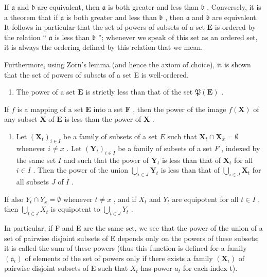 If \(\mathfrak{a}\) and \(\mathfrak{b}\) are equivalent, then \(\mathfrak{a}\) is both greater and less than \(\mathfrak{b}\) . Conversely, it is a theorem that if \(\mathfrak{a}\) is both greater and less than \(\mathfrak{b}\) , then \(\mathfrak{a}\) and \(\mathfrak{b}\) are equivalent. It follows in particular that the set of powers of subsets of a set \(\mathbf{E}\) is ordered by the relation `` \(\mathfrak{a}\) is less than \(\mathfrak{b}\) ''; whenever we speak of this set as an ordered set, it is always the ordering defined by this relation that we mean.

Furthermore, using Zorn's lemma (and hence the axiom of choice), it is shown that the set of powers of subsets of a set E is well-ordered.

\begin{enumerate}
\def\labelenumi{\arabic{enumi}.}
\setcounter{enumi}{3}
\tightlist
\item
  The power of a set \(\mathbf{E}\) is strictly less than that of the set \(\mathfrak{P}(\mathbf{E})\) .
\end{enumerate}

If \(f\) is a mapping of a set \(\mathbf{E}\) into a set \(\mathbf{F}\) , then the power of the image \(f(\mathbf{X})\) of any subset \(\mathbf{X}\) of \(\mathbf{E}\) is less than the power of \(\mathbf{X}\) .

\begin{enumerate}
\def\labelenumi{\arabic{enumi}.}
\setcounter{enumi}{4}
\tightlist
\item
  Let \((\mathbf{X}_t)_{i \in I}\) be a family of subsets of a set \(E\) such that \(\mathbf{X}_t \cap \mathbf{X}_x = \emptyset\) whenever \(i \neq x\) . Let \((\mathbf{Y}_t)_{i \in I}\) be a family of subsets of a set \(F\) , indexed by the same set \(I\) and such that the power of \(\mathbf{Y}_t\) is less than that of \(\mathbf{X}_t\) for all \(i \in I\) . Then the power of the union \(\bigcup_{i \in J} \mathbf{Y}_t\) is less than that of \(\bigcup_{i \in J} \mathbf{X}_t\) for all subsets \(J\) of \(I\) .
\end{enumerate}

If also \(Y_{t} \cap Y_{x} = \emptyset\) whenever \(t \neq x\) , and if \(X_{t}\) and \(Y_{t}\) are equipotent for all \(t \in I\) , then \(\bigcup_{t \in J} X_{t}\) is equipotent to \(\bigcup_{t \in J} Y_{t}\) .

In particular, if F and E are the same set, we see that the power of the union of a set of pairwise disjoint subsets of E depends only on the powers of these subsets; it is called the sum of these powers (thus this function is defined for a family \((\mathfrak{a}_{\iota})\) of elements of the set of powers only if there exists a family \((\mathbf{X}_{\iota})\) of pairwise disjoint subsets of E such that \(X_{t}\) has power \(a_{t}\) for each index t).

